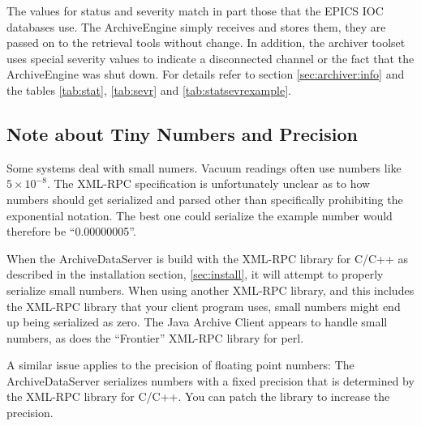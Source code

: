 \noindent The values for status and severity match in part those that
the EPICS IOC databases use. The ArchiveEngine simply receives and
stores them, they are passed on to the retrieval tools without
change. In addition, the archiver toolset uses special severity values
to indicate a disconnected channel or the fact that the ArchiveEngine
was shut down.  For details refer to section \ref{sec:archiver:info}
and the tables \ref{tab:stat}, \ref{tab:sevr} and
\ref{tab:statsevrexample}.

\subsection{Note about Tiny Numbers and Precision} \label{sec:xml:tiny} %
Some systems deal with small numers. Vacuum readings often use numbers
like $5 \times 10^{-8}$. The XML-RPC specification is unfortunately
unclear as to how numbers should get serialized and parsed other than
specifically prohibiting the exponential notation. The best one could
serialize the example number would therefore be ``0.00000005''.

When the ArchiveDataServer is build with the XML-RPC library for C/C++
as described in the installation section, \ref{sec:install}, it will
attempt to properly serialize small numbers.  When using another
XML-RPC library, and this includes the XML-RPC library that your
client program uses, small numbers might end up being serialized as
zero. The Java Archive Client appears to handle small numbers, as does
the ``Frontier'' XML-RPC library for perl.

A similar issue applies to the precision of floating point numbers:
The ArchiveDataServer serializes numbers with a fixed precision that
is determined by the XML-RPC library for C/C++. You can patch the
library to increase the precision.

